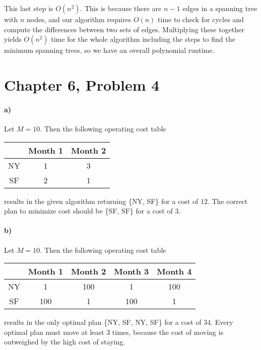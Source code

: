 \documentclass[12pt]{article}
\begin{document}
This last step is \(O(n^2)\). This is because there are \(n-1\) edges in a spanning tree with \(n\) nodes, and our algorithm requires \(O(n)\) time to
check for cycles and compute the differences between two sets of edges. Multiplying these together yields \(O(n^2)\) time for the whole algorithm including the steps
to find the minimum spanning trees, so we have an overall polynomial runtime.

\pagebreak

\section*{Chapter 6, Problem 4}

\paragraph{a)}

Let \(M=10\). Then the following operating cost table
\begin{center}
        \begin{tabular}{c | c c}
                & Month 1 & Month 2\\
                \hline
                NY & 1 & 3\\
                SF & 2 & 1\\
        \end{tabular}
\end{center}
results in the given algorithm returning \{NY, SF\} for a cost of \(12\). The correct plan to minimize
cost should be \{SF, SF\} for a cost of \(3\).

\paragraph{b)}

Let \(M=10\). Then the following operating cost table
\begin{center}
        \begin{tabular}{c | c c c c}
                & Month 1 & Month 2 & Month 3 & Month 4\\
                \hline
                NY & 1 & 100 & 1 & 100\\
                SF & 100 & 1 & 100 & 1 \\
        \end{tabular}
\end{center}
results in the only optimal plan \{NY, SF, NY, SF\} for a cost of \(34\). Every optimal plan must move at least
\(3\) times, because the cost of moving is outweighed by the high cost of staying.
\end{document}
